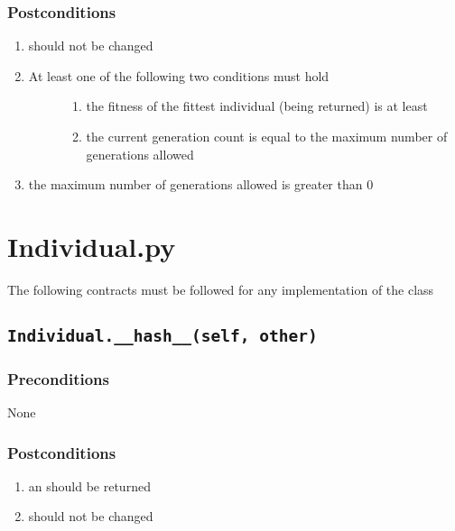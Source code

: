 \documentclass[letterpaper,10pt,english]{sphinxmanual}
\begin{document}
\subsubsection{Postconditions}
\label{contracts:postconditions}\begin{enumerate}
\item {} 
 should not be changed

\item {} \begin{description}
\item[{At least one of the following two conditions must hold}] \leavevmode\begin{enumerate}
\item {} 
the fitness of the fittest individual (being returned) is at least 

\item {} 
the current generation count is equal to the maximum number of generations allowed

\end{enumerate}

\end{description}

\item {} 
the maximum number of generations allowed is greater than 0

\end{enumerate}


\section{Individual.py}
\label{contracts:individual-py}
The following contracts must be followed for any implementation of the  class


\subsection{\texttt{Individual.\_\_hash\_\_(self, other)}}
\label{contracts:individual-hash-self-other}

\subsubsection{Preconditions}
\label{contracts:id1}
None


\subsubsection{Postconditions}
\label{contracts:id2}\begin{enumerate}
\item {} 
an  should be returned

\item {} 
 should not be changed

\end{enumerate}
\end{document}
